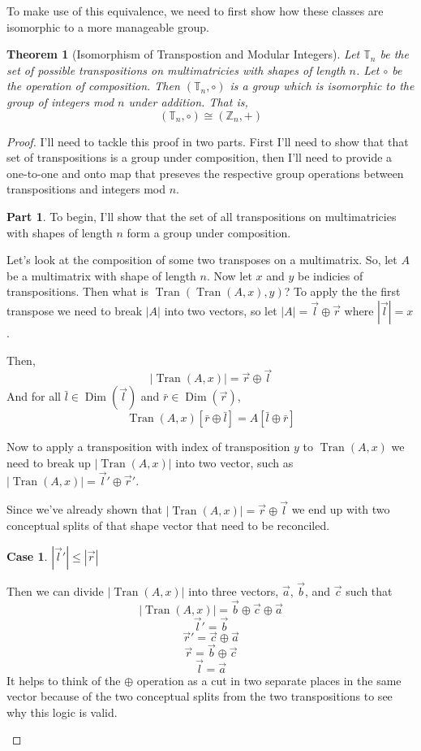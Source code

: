 \documentclass[12pt]{book}
\theoremstyle{plain}
\newtheorem{theorem}{Theorem}[chapter]
\theoremstyle{definition}
\theoremstyle{ppart}
\newtheorem{ppart}{Part}
\theoremstyle{case}
\newtheorem{case}{Case}
\theoremstyle{solution}
\DeclareMathOperator{\Dim}{Dim}
\DeclareMathOperator{\Tran}{Tran}
\newcommand{\shape}[1]{\left|#1\right|}
\begin{document}
To make use of this equivalence, we need to first show how these classes are
isomorphic \cite{book:abstract} to a more manageable group.

\begin{theorem}[Isomorphism of Transpostion and Modular Integers]
\label{tran_int_iso}
Let $\mathbb{T}_n$ be the set of possible transpositions on multimatricies with
shapes of length $n$. Let $\circ$ be the operation of composition. Then
$(\mathbb{T}_n, \circ)$ is a group which is isomorphic to the group of
integers mod $n$ under addition. That is,
\[ (\mathbb{T}_n, \circ) \cong (\mathbb{Z}_n, +) \]
\end{theorem}
\begin{proof}
I'll need to tackle this proof in two parts. First I'll need to show that
that set of transpositions is a group under composition, then I'll need to
provide a one-to-one and onto map that preseves the respective group operations
between transpositions and integers mod $n$.

\begin{ppart}
To begin, I'll show that the set of all transpositions on multimatricies 
with shapes of length $n$ form a group under composition.

Let's look at the composition of some two transposes on a multimatrix.
So, let $A$ be a multimatrix with shape of length $n$. Now let $x$ and $y$
be indicies of transpositions. Then what is $\Tran(\Tran(A, x), y)$?
To apply the the first transpose we need to break $\shape{A}$ into two vectors,
so let $\shape{A} = \vec{l} \oplus \vec{r}$ where $\shape{\vec{l}} = x$.

Then,
\[ \shape{\Tran(A, x)} = \vec{r} \oplus \vec{l} \]
And for all
$\bar{l} \in \Dim(\vec{l})$ and $\bar{r} \in \Dim(\vec{r})$,
\[ \Tran(A, x)[\bar{r} \oplus \bar{l}] = A[\bar{l} \oplus \bar{r}] \]

Now to apply a transposition with index of transposition $y$ to $\Tran(A,x)$
we need to break up $\shape{\Tran(A,x)}$ into two vector, such as
$\shape{\Tran(A,x)} = \vec{l}' \oplus \vec{r}'$.

Since we've already shown that $\shape{\Tran(A,x)} = \vec{r} \oplus \vec{l}$
we end up with two conceptual splits of that shape vector that need to
be reconciled.

\begin{case} $\shape{\vec{l}'} \le \shape{\vec{r}}$

Then we can divide $\shape{\Tran(A,x)}$ into three vectors, $\vec{a}$, $\vec{b}$, and $\vec{c}$
such that
\[ \shape{\Tran(A,x)} = \vec{b} \oplus \vec{c} \oplus \vec{a} \]
\[ \vec{l}' = \vec{b} \]
\[ \vec{r}' = \vec{c} \oplus \vec{a} \]
\[ \vec{r} = \vec{b} \oplus \vec{c} \]
\[ \vec{l} = \vec{a} \]
It helps to think of the $\oplus$ operation as a cut in two separate places in the same
vector because of the two conceptual splits from the two transpositions to see why this
logic is valid.


\end{case}
\end{ppart}
\end{proof}
\end{document}
